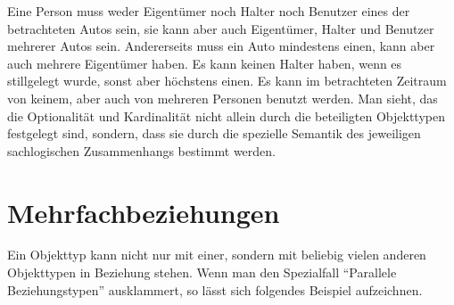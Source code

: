         Eine Person muss weder Eigent\"umer noch Halter noch Benutzer eines der betrachteten Autos sein, sie kann aber auch Eigent\"umer, Halter und Benutzer mehrerer Autos sein. Andererseits muss ein Auto mindestens einen, kann aber auch mehrere Eigent\"umer haben. Es kann keinen Halter haben, wenn es stillgelegt wurde, sonst aber h\"ochstens einen. Es kann im betrachteten Zeitraum von keinem, aber auch von mehreren Personen benutzt werden. Man sieht, das die Optionalit\"at und Kardinalit\"at nicht allein durch die beteiligten Objekttypen festgelegt sind, sondern, dass sie durch die spezielle Semantik des jeweiligen sachlogischen Zusammenhangs bestimmt werden.
        \begin{center}
        \end{center}

      \section{Mehrfachbeziehungen}
        Ein Objekttyp kann nicht nur mit einer, sondern mit beliebig vielen anderen Objekttypen in Beziehung stehen. Wenn man den Spezialfall \enquote{Parallele Beziehungstypen} ausklammert, so l\"asst sich folgendes Beispiel aufzeichnen.


